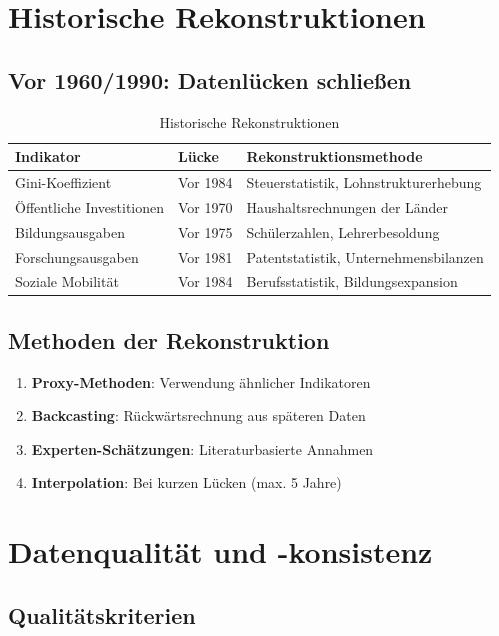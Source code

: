 \section{Historische Rekonstruktionen}

\subsection{Vor 1960/1990: Datenlücken schließen}

\begin{table}[ht]
\centering
\begin{tabular}{lll}
\toprule
\textbf{Indikator} & \textbf{Lücke} & \textbf{Rekonstruktionsmethode} \\
\midrule
Gini-Koeffizient & Vor 1984 & Steuerstatistik, Lohnstrukturerhebung \\
Öffentliche Investitionen & Vor 1970 & Haushaltsrechnungen der Länder \\
Bildungsausgaben & Vor 1975 & Schülerzahlen, Lehrerbesoldung \\
Forschungsausgaben & Vor 1981 & Patentstatistik, Unternehmensbilanzen \\
Soziale Mobilität & Vor 1984 & Berufsstatistik, Bildungsexpansion \\
\bottomrule
\end{tabular}
\caption{Historische Rekonstruktionen}
\label{tab:historische-rekonstruktion}
\end{table}

\subsection{Methoden der Rekonstruktion}

\begin{enumerate}
\item \textbf{Proxy-Methoden}: Verwendung ähnlicher Indikatoren
\item \textbf{Backcasting}: Rückwärtsrechnung aus späteren Daten
\item \textbf{Experten-Schätzungen}: Literaturbasierte Annahmen
\item \textbf{Interpolation}: Bei kurzen Lücken (max. 5 Jahre)
\end{enumerate}

\section{Datenqualität und -konsistenz}

\subsection{Qualitätskriterien}

